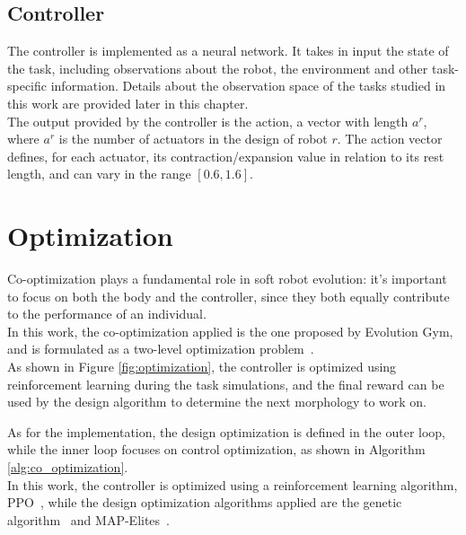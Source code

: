 \subsection{Controller}
The controller is implemented as a neural network.
It takes in input the state of the task, including observations about the robot, the environment and other task-specific information. Details about the observation space of the tasks studied in this work are provided later in this chapter.\\
The output provided by the controller is the action, a vector with length $a^r$, where $a^r$ is the number of actuators in the design of robot $r$. The action vector defines, for each actuator, its contraction/expansion value in relation to its rest length, and can vary in the range $[0.6, 1.6]$.


\section{Optimization}
Co-optimization plays a fundamental role in soft robot evolution: it's important to focus on both the body and the controller, since they both equally contribute to the performance of an individual.\\
In this work, the co-optimization applied is the one proposed by Evolution Gym, and is formulated as a two-level optimization problem~\cite{bhatia2021evolution}.\\
As shown in Figure \ref{fig:optimization}, the controller is optimized using reinforcement learning during the task simulations, and the final reward can be used by the design algorithm to determine the next morphology to work on.

As for the implementation, the design optimization is defined in the outer loop, while the inner loop focuses on control optimization, as shown in Algorithm \ref{alg:co_optimization}.\\
In this work, the controller is optimized using a reinforcement learning algorithm, PPO~\cite{kostrikov2018}, while the design optimization algorithms applied are the genetic algorithm~\cite{evogym} and MAP-Elites~\cite{qdpy}.

